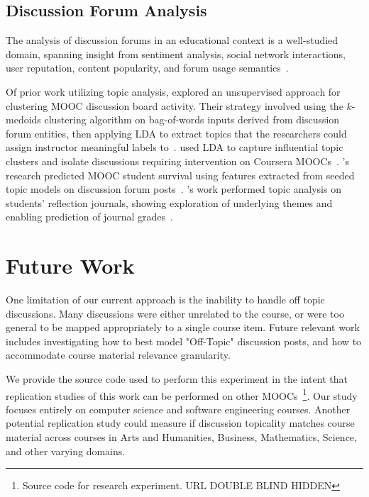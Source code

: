\documentclass[sigconf, anonymous]{acmart}
\begin{document}
\subsection{Discussion Forum Analysis}
The analysis of discussion forums in an educational context is a well-studied domain, spanning insight from sentiment analysis, social network interactions, user reputation, content popularity, and forum usage semantics~\cite{wen2014sentiment,wong2015analysis,coetzee2014should,breslow2013studying,onah2014exploring}.

Of prior work utilizing topic analysis, \citeauthor{ezen2015unsupervised} explored an unsupervised approach for clustering MOOC discussion board activity. Their strategy involved using the $k$-medoids clustering algorithm on bag-of-words inputs derived from discussion forum entities, then applying LDA to extract topics that the researchers could assign instructor meaningful labels to~\cite{ezen2015unsupervised}.
\citeauthor{atapattu2016topic} used LDA to capture influential topic clusters and isolate discussions requiring intervention on Coursera MOOCs~\cite{atapattu2016topic}.
\citeauthor{ramesh2014understanding}'s research predicted MOOC student survival using features extracted from seeded topic models on discussion forum posts~\cite{ramesh2014understanding}.
\citeauthor{Chen:2016:TME:2883851.2883951}'s work performed topic analysis on students' reflection journals, showing exploration of underlying themes and enabling prediction of journal grades~\cite{Chen:2016:TME:2883851.2883951}.

\section{Future Work}
One limitation of our current approach is the inability to handle off topic discussions.
Many discussions were either unrelated to the course, or were too general to be mapped appropriately to a single course item.
Future relevant work includes investigating how to best model "Off-Topic" discussion posts, and how to accommodate course material relevance granularity.

We provide the source code used to perform this experiment in the intent that replication studies of this work can be performed on other MOOCs~\footnote{Source code for research experiment.
    URL DOUBLE BLIND HIDDEN}.
Our study focuses entirely on computer science and software engineering courses.
Another potential replication study could measure if discussion topicality matches course material across courses in Arts and Humanities, Business, Mathematics, Science, and other varying domains.
\end{document}
